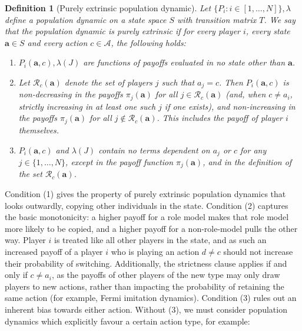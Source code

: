 \documentclass{article}
\newtheorem{definition}{Definition}
\begin{document}
\begin{definition}[Purely extrinsic population dynamic]
    Let \(\{P_i: i \in [1, \dots, N]\},\lambda\) define a population dynamic on
    a state space \(S\) with transition matrix \(T\). We say that the population
    dynamic is purely extrinsic if for every player \(i\), every state
    \(\mathbf{a} \in S\) and every action \(c \in \mathcal{A}\), the following
    holds:

    \begin{enumerate}
        \item \(P_i(\mathbf{a}, c), \lambda(J)\) are functions of payoffs
        evaluated in no state other than \(\mathbf{a}\). 
        \item Let \(\mathcal{R}_c(\mathbf{a})\) denote the set of players \(j\)
        such that \(a_j = c\). Then \(P_i(\mathbf{a}, c)\) is non-decreasing in
        the payoffs \(\pi_j(\mathbf{a})\) for all \(j \in
        \mathcal{R}_c(\mathbf{a})\) (and, when \(c \neq a_i\), strictly
        increasing in at least one such \(j\) if one exists), and non-increasing
        in the payoffs \(\pi_j(\mathbf{a})\) for all \(j \notin
        \mathcal{R}_c(\mathbf{a})\). This includes the payoff of player \(i\)
        themselves.
        \item \(P_i(\mathbf{a}, c)\) and \(\lambda(J)\) contain no terms
        dependent on \(a_j\) or \(c\) for any \(j \in \{1, \dots, N\}\), except
        in the payoff function \(\pi_j(\mathbf{a})\), and in the definition of
        the set \(\mathcal{R}_c(\mathbf{a})\).
    \end{enumerate}
    \label{def:purely_extrinsic}
\end{definition}

Condition (1) gives the property of purely extrinsic population dynamics that
looks outwardly, copying other individuals in the state. Condition (2) captures
the basic monotonicity: a higher payoff for a role model makes that role model
more likely to be copied, and a higher payoff for a non-role-model pulls the
other way. Player \(i\) is treated like all other players in the state, and as
such an increased payoff of a player \(i\) who is playing an action \(d \neq c\)
should not increase their probability of switching. Additionally, the strictness
clause applies if and only if \(c \neq a_i\), as the payoffs of other players of
the new type may only draw players to new actions, rather than impacting the
probability of retaining the same action (for example, Fermi imitation
dynamics). Condition (3) rules out an inherent bias towards
either action. Without (3), we must consider population dynamics which
explicitly favour a certain action type, for example:
\end{document}
